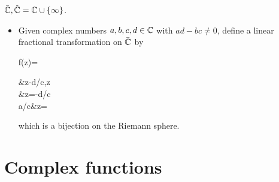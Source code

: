 \documentclass[10pt,a4paper]{book}
\begin{document}
\noindent\underline{} $\bar{\mathbb C}, \hat{\mathbb C}=\mathbb C\cup\{\infty \}$.  
\begin{itemize}
	\item Given complex numbers $a,b,c,d\in\mathbb C$ with $ad-bc\neq 0$, define a linear fractional transformation on $\bar{\mathbb C}$ by   
	\begin{sequation*}
		f(z)=\begin{cases}
			&z\neq-d/c,z\neq\infty\\
			\infty&z=-d/c\\
			a/c&z=\infty
		\end{cases}
	\end{sequation*}
	which is a bijection on the Riemann sphere.
\end{itemize}

\section{Complex functions}\label{sec:complex-fun}
\end{document}
